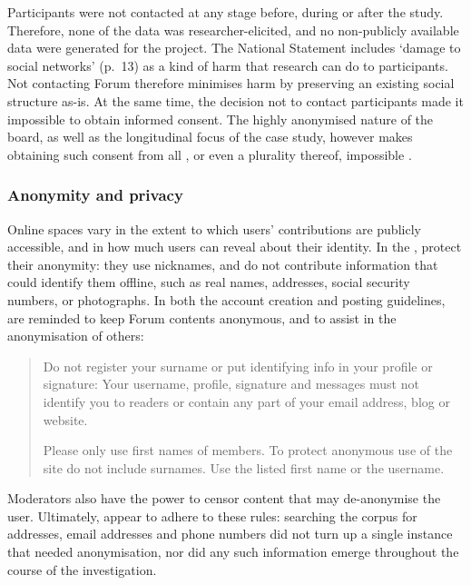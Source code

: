 Participants were not contacted at any stage before, during or after the study. Therefore, none of the data was researcher\hyp{}elicited, and no non\hyp{}publicly available data were generated for the project. The National Statement includes `damage to social networks' (p.~13) as a kind of harm that research can do to participants. Not contacting \gls{Forum}  therefore minimises harm by preserving an existing social structure as\hyp{}is. At the same time, the decision not to contact participants made it impossible to obtain informed consent. The highly anonymised nature of the board, as well as the longitudinal focus of the case study, however makes obtaining such consent from all , or even a plurality thereof, impossible \cite{kaufman2016producing,stommel_use_2011}. %

\subsubsection{Anonymity and privacy}

Online spaces vary in the extent to which users' contributions are publicly accessible, and in how much users can reveal about their identity. In the ,  protect their anonymity: they use nicknames, and do not contribute information that could identify them offline, such as real names, addresses, social security numbers, or photographs. In both the account creation and posting guidelines,  are reminded to keep \gls{Forum} contents anonymous, and to assist in the anonymisation of others:

\begin{quote}
\small \singlespacing 
Do not register your surname or put identifying info in your profile or signature: Your username, profile, signature and messages must not identify you to readers or contain any part of your email address, blog or website. %

Please only use first names of members. To protect anonymous use of the site do not include surnames. Use the listed first name or the username. %

\end{quote}
%
Moderators also have the power to censor content that may de\hyp{}anonymise the user. Ultimately,  appear to adhere to these rules: searching the \gls{corpus} for addresses, email addresses and phone numbers did not turn up a single instance that needed anonymisation, nor did any such information emerge throughout the course of the investigation.

